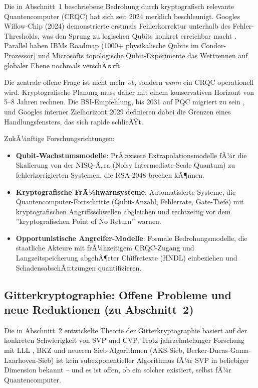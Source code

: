 ﻿\documentclass[a4paper,12pt]{article}
\theoremstyle{definition}
\begin{document}
Die in Abschnitt~1 beschriebene Bedrohung durch kryptografisch relevante
Quantencomputer (CRQC) hat sich seit 2024 merklich beschleunigt.
Googles Willow-Chip (2024) demonstrierte erstmals Fehlerkorrektur
unterhalb des Fehler-Thresholds, was den Sprung zu logischen Qubits
konkret erreichbar macht \cite{Goo26,Hei26}.
Parallel haben IBMs Roadmap (1000+ physikalische Qubits im
Condor-Prozessor) und Microsofts topologische Qubit-Experimente
das Wettrennen auf globaler Ebene nochmals verschÃ¤rft.

Die zentrale offene Frage ist nicht mehr \emph{ob}, sondern \emph{wann}
ein CRQC operationell wird. Kryptografische Planung muss daher mit
einem konservativen Horizont von 5--8 Jahren rechnen.
Die BSI-Empfehlung, bis 2031 auf PQC migriert zu sein \cite{BSI24},
und Googles interner Zielhorizont 2029 \cite{Goo26} definieren dabei
die Grenzen eines Handlungsfensters, das sich rapide schlieÃŸt.

ZukÃ¼nftige Forschungsrichtungen:
\begin{itemize}
  \item \textbf{Qubit-Wachstumsmodelle}: PrÃ¤zisere Extrapolationsmodelle
    fÃ¼r die Skalierung von der NISQ-Ã„ra (Noisy Intermediate-Scale Quantum)
    zu fehlerkorrigierten Systemen, die RSA-2048 brechen kÃ¶nnen.
  \item \textbf{Kryptografische FrÃ¼hwarnsysteme}: Automatisierte Systeme,
    die Quantencompu\-ter-Fortschritte (Qubit-Anzahl, Fehlerrate, Gate-Tiefe)
    mit kryptografischen Angriffsschwellen abgleichen und rechtzeitig
    vor dem ''kryptografischen Point of No Return'' warnen.
  \item \textbf{Opportunistische Angreifer-Modelle}: Formale Bedrohungsmodelle,
    die staatliche Akteure mit frÃ¼hzeitigem CRQC-Zugang und
    Langzeitspeicherung abgehÃ¶rter Chiffretexte (HNDL) einbeziehen
    und SchadensabschÃ¤tzungen quantifizieren.
\end{itemize}

\subsection{Gitterkryptographie: Offene Probleme und neue Reduktionen (zu Abschnitt~2)}

Die in Abschnitt~2 entwickelte Theorie der Gitterkryptographie basiert
auf der konkreten Schwierigkeit von SVP und CVP. Trotz jahrzehntelanger
Forschung mit LLL \cite{LLL82}, BKZ und neueren Sieb-Algorithmen
(AKS-Sieb, Becker-Ducas-Gama-Laarhoven-Sieb) ist kein subexponentieller
Algorithmus fÃ¼r SVP in beliebiger Dimension bekannt -- und es ist offen,
ob ein solcher existiert, selbst fÃ¼r Quantencomputer.
\end{document}
